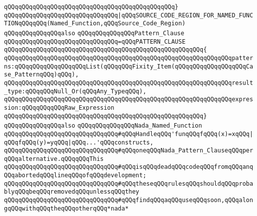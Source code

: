 \verb|qQQqqQQqqQQqqQQqqQQqqQQqqQQqqQQqqQQqqQQqqQQqqQQq}|\newline
\newline
\verb|qQQqqQQqqQQqqQQqqQQqqQQqqQQqqQQq|\verb#|qQQqSOURCE_CODE_REGION_FOR_NAMED_FUNCTIONqQQqqQQq(Named_Function,qQQqSource_Code_Region)#\newline
\newline
\newline
\newline
\verb|qQQqqQQqqQQqqQQqalso|\newline
\verb|qQQqqQQqqQQqqQQqPattern_Clause|\newline
\newline
\verb|qQQqqQQqqQQqqQQqqQQqqQQqqQQqqQQq=qQQqPATTERN_CLAUSE|\newline
\verb|qQQqqQQqqQQqqQQqqQQqqQQqqQQqqQQqqQQqqQQqqQQqqQQqqQQqqQQq{|\newline
\verb|qQQqqQQqqQQqqQQqqQQqqQQqqQQqqQQqqQQqqQQqqQQqqQQqqQQqqQQqqQQqqQQqpatterns:qQQqqQQqqQQqqQQqqQQqList(qQQqqQQqFixity_Item(qQQqqQQqqQQqqQQqqQQqCase_PatternqQQq)qQQq),|\newline
\verb|qQQqqQQqqQQqqQQqqQQqqQQqqQQqqQQqqQQqqQQqqQQqqQQqqQQqqQQqqQQqqQQqresult_type:qQQqqQQqNull_Or(qQQqAny_TypeqQQq),|\newline
\verb|qQQqqQQqqQQqqQQqqQQqqQQqqQQqqQQqqQQqqQQqqQQqqQQqqQQqqQQqqQQqqQQqexpression:qQQqqQQqqQQqRaw_Expression|\newline
\verb|qQQqqQQqqQQqqQQqqQQqqQQqqQQqqQQqqQQqqQQqqQQqqQQqqQQqqQQq}|\newline
\newline
\newline
\verb|qQQqqQQqqQQqqQQqalso|\newline
\verb|qQQqqQQqqQQqqQQqNada_Named_Function|\newline
\newline
\verb|qQQqqQQqqQQqqQQqqQQqqQQqqQQqqQQq#qQQqHandleqQQq'funqQQqfqQQq(x)=xqQQq|\verb#|qQQqfqQQq(y)=yqQQq|qQQq...'qQQqconstructs,#\newline
\verb|qQQqqQQqqQQqqQQqqQQqqQQqqQQqqQQq#qQQqoneqQQqNada_Pattern_ClauseqQQqperqQQqalternative.qQQqqQQqThis|\newline
\verb|qQQqqQQqqQQqqQQqqQQqqQQqqQQqqQQq#qQQqisqQQqdeadqQQqcodeqQQqfromqQQqanqQQqabortedqQQqlineqQQqofqQQqdevelopment;|\newline
\verb|qQQqqQQqqQQqqQQqqQQqqQQqqQQqqQQq#qQQqtheseqQQqrulesqQQqshouldqQQqprobablyqQQqbeqQQqremovedqQQqunlessqQQqthey|\newline
\verb|qQQqqQQqqQQqqQQqqQQqqQQqqQQqqQQq#qQQqfindqQQqaqQQquseqQQqsoon,qQQqalongqQQqwithqQQqtheqQQqotherqQQq*nada*|\newline
